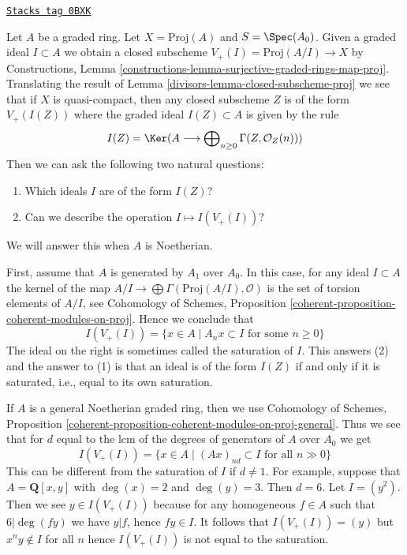 \begin{example}
\label{divisors-example-closed-subscheme-of-proj}
\href{https://stacks.math.columbia.edu/tag/0BXK}{\texttt{Stacks tag 0BXK}}

Let $A$ be a graded ring. Let $X = \text{Proj}(A)$ and $S = \Spec(A_0)$.
Given a graded ideal $I \subset A$ we obtain a closed subscheme
$V_+(I) = \text{Proj}(A/I) \to X$ by Constructions, Lemma
\ref{constructions-lemma-surjective-graded-rings-map-proj}.
Translating the result of Lemma \ref{divisors-lemma-closed-subscheme-proj}
we see that if $X$ is quasi-compact, then any closed subscheme $Z$
is of the form $V_+(I(Z))$ where the graded ideal $I(Z) \subset A$
is given by the rule
$$
I(Z) = \Ker(A \longrightarrow
\bigoplus\nolimits_{n \geq 0} \Gamma(Z, \mathcal{O}_Z(n)))
$$
Then we can ask the following two natural questions:
\begin{enumerate}
\item Which ideals $I$ are of the form $I(Z)$?
\item Can we describe the operation $I \mapsto I(V_+(I))$?
\end{enumerate}
We will answer this when $A$ is Noetherian.

\medskip\noindent
First, assume that $A$ is generated by $A_1$ over $A_0$. In this case,
for any ideal $I \subset A$ the kernel of the map
$A/I \to \bigoplus \Gamma(\text{Proj}(A/I), \mathcal{O})$
is the set of torsion elements of $A/I$, see
Cohomology of Schemes, Proposition
\ref{coherent-proposition-coherent-modules-on-proj}.
Hence we conclude that
$$
I(V_+(I)) = \{x \in A \mid A_n x \subset I\text{ for some }n \geq 0\}
$$
The ideal on the right is sometimes called the saturation of $I$.
This answers (2) and the answer to (1) is that an ideal is
of the form $I(Z)$ if and only if it is saturated, i.e., equal
to its own saturation.

\medskip\noindent
If $A$ is a general Noetherian graded ring, then we use
Cohomology of Schemes, Proposition
\ref{coherent-proposition-coherent-modules-on-proj-general}.
Thus we see that for $d$ equal to the lcm of the degrees
of generators of $A$ over $A_0$ we get
$$
I(V_+(I)) = \{x \in A \mid (Ax)_{nd} \subset I\text{ for all }n \gg 0\}
$$
This can be different from the saturation of $I$ if $d \not = 1$.
For example, suppose that $A = \mathbf{Q}[x, y]$
with $\deg(x) = 2$ and $\deg(y) = 3$. Then $d = 6$.
Let $I = (y^2)$. Then we see $y \in I(V_+(I))$ because
for any homogeneous $f \in A$ such that $6 | \deg(fy)$
we have $y | f$, hence $fy \in I$. It follows that
$I(V_+(I)) = (y)$ but $x^n y \not \in I$ for all $n$
hence $I(V_+(I))$ is not equal to the saturation.
\end{example}

